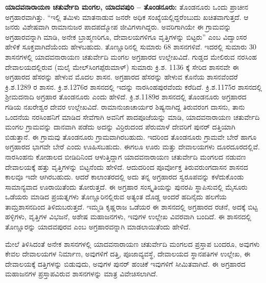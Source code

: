 \textbf{ಯಾದವನಾರಾಯಣ ಚತುರ್ವೇದಿ ಮಂಗಲ, ಯಾದವಪುರಿ – ತೊಂಡನೂರು:} ತೊಂಡನೂರು ಒಂದು ಪ್ರಾಚೀನ ಅಗ್ರಹಾರವಾಗಿತ್ತು. “ಇಲ್ಲಿ ತಮಿಳು ಮಾತನಾಡುವ ಜನರೇ ಅಧಿಕ ಸಂಖ್ಯೆಯಲ್ಲಿದ್ದರೆಂಬುದು ಖಚಿತವಾಗುತ್ತದೆ. ಆ ಜನರು ವಿಶೇಷವಾಗಿ ರಾಮಾನುಜರ ಪಾದಪದ್ಮೋಪ ಜೀವಿಗಳಾಗಿದ್ದರು. ಅವರಿಗಾಗಿಯೇ ಈ ಗ್ರಾಮವನ್ನು ಅಗ್ರಹಾರವನ್ನಾಗಿ ಮಾಡಿ, ಅನೇಕ ಬ್ರಾಹ್ಮಣರಿಗೂ, ದೇವಾಲಯಗಳಿಗೂ ವೃತ್ತಿಗಳನ್ನು ಬಿಟ್ಟರು” ಎಂಬ ವಿದ್ವಾಂಸರ ಹೇಳಿಕೆ ಸೂಕ್ತವಾಗಿದೆಯೆಂದು ಹೇಳಬಹುದು. ತೊಣ್ಣೂರಿನಲ್ಲಿ ಸುಮಾರು 68 ಶಾಸನಗಳಿವೆ. ಇದರಲ್ಲಿ ಸುಮಾರು 30 ಶಾಸನಗಳಲ್ಲಿ ಯಾದವನಾರಾಯಣ ಚತುರ್ವೇದಿ ಮಂಗಲ ಅಗ್ರಹಾರದ ಉಲ್ಲೇಖವಿದೆ. ಗುಡ್ಡದ ಮೇಲಿರುವ ನರಸಿಂಹ ದೇವಾಲಯದಲ್ಲಿರುವ (ಮಲೈ ಮೇಲ್​ ಸಿಂಗಪ್ಪೆರುಮಾಳ್​) ಸುಮಾರು ಕ್ರಿ.ಶ. 1136 ಕ್ಕೆ ಸೇರಿದ ಶಾಸನವೇ ಈ ಅಗ್ರಹಾರದ ಹೆಸರನ್ನು ಹೇಳುವ ಮೊದಲ ಶಾಸನ. ಅಗ್ರಹಾರದ ಹೆಸರನ್ನು ಹೇಳುವ ಕೊನೆಯ ಶಾಸನವೆಂದರೆ ಕ್ರಿ.ಶ.1289 ರ ಶಾಸನ. ಕ್ರಿ.ಶ.1276ರ ಶಾಸನದಲ್ಲಿ ಇದನ್ನು ನಾರಸಿಂಹಪುರವೆಂದು ಕರೆದಿದೆ. ಕ್ರಿ.ಶ.1175ರ ಶಾಸನದಲ್ಲಿ ಶ‍್ರೀಮದನಾದಿ ಅಗ್ರಹಾರ ತೊಂಡನೂರು ಎಂದು ಹೇಳಿದೆ. ಕ್ರಿ.ಶ.1189ರ ಶಾಸನದಲ್ಲಿ ತೊಂಡನೂರು ಅಗ್ರಹಾರದ ಗಡಿಯ ನಖರೇಶ್ವರ ದೇವರ ಉಲ್ಲೇಖವಿದೆ. ರಾಮಾನುಜಾಚಾರ್ಯರ ಶಿಷ್ಯನಾಗಿದ್ದ ತಿರುವರಂಗ ದಾಸನು, ತಾನು ಒಂದನೆಯ ನರಸಿಂಹನಿಗೆ ಮಾಡಿದ ಸೇವೆಗಾಗಿ ಅವನಿಗೆ ಪಾದಪೂಜೆಯನ್ನು ಮಾಡಿ, ಯಾದವನಾರಾಯಣ ಚತುರ್ವೇದಿ ಮಂಗಲ ಗ್ರಾಮವನ್ನು ದಾನವಾಗಿ ಪಡೆದು ಅದನ್ನು ವಿರ್ರಿರುದಂದ ಪೆರುಮಾಳೆ ದೇವರಿಗೆ ಪುನರ್​ ದತ್ತಿಯಾಗಿ ಬಿಡುತ್ತಾನೆ. ಈ ಗ್ರಾಮವು ತೊಂಡನೂರು ಗ್ರಾಮವಾಗಿರಬಹುದು. ಇದರಿಂದ ತೊಂಡನೂರು ಗ್ರಾಮವೇ ಬೇರೆ ಹಾಗೂ ಅಗ್ರಹಾರದ ಭಾಗವೇ ಬೇರೆ ಎಂದು ಊಹಿಸಬಹುದು. ಈಗಲೂ ಊರು ಮತ್ತು ದೇವಾಲಯಗಳು ದೂರದೂರದಲ್ಲಿವೆ. ನಾರಸಿಂಹನು ಕೋಡಾಲದ ಬೀಡಿದಿನಿಂದ ಆಳುತ್ತಿದ್ದಾಗ ಯಾದವನಾರಾಯಣ ಚತುರ್ವೇದಿ ಮಂಗಲದ ನಡುವಣ ದೇವಾಲಯಕ್ಕೆ ಹತ್ತು ವೃತ್ತಿಗಳನ್ನು ಬಿಟ್ಟನೆಂದು ಹೇಳಿದೆ. ಆದುದರಿಂದ ಪೂರ್ವೋಕ್ತ ತಿರುವರುಂಗದಾಸನ ಶಾಸನದ ಕಾಲವೂ ಇದೇ ಆಗಿರಬಹುದು. ಆದರೆ ಕಾಲಾಂತರದಲ್ಲಿ ಅದು ತನ್ನ ಅಗ್ರಹಾರದ ಸ್ವರೂಪವನ್ನು ಕಳೆದುಕೊಂಡು ಸಾಮಾನ್ಯವಾದ ಊರಾಯಿತೆಂದು ತೋರುತ್ತದೆ. ಈ ಅಗ್ರಹಾರ ಸಂಸ್ಕೃತಿಯನ್ನು ಪುನರಪಿ ಸ್ಥಾಪಿಸುವಲ್ಲಿ ಮೈಸೂರು ಒಡೆಯರು ಮಾಡಿದ ಪ್ರಯತ್ನಗಳು ತೊಣ್ಣೂರಿನಲ್ಲಿರುವ ಅತ್ಯಂತ ದೊಡ್ಡ ಅಂದರೆ ಹದಿನೈದು ಹಲಗೆಯ ತಾಮ್ರಶಾಸನದಿಂದ ತಿಳಿದುಬರುತ್ತದೆ. ಇಮ್ಮಡಿ ಕೃಷ್ಣರಾಜ ಒಡೆಯರ ಈ ಶಾಸನದಲ್ಲಿ ಅಗ್ರಹಾರದ ರಚನೆ, ಅದಕ್ಕೆ ಬಿಟ್ಟ ಹಳ್ಳಿಗಳು, ವೃತ್ತಿಗಳ ವಿಭಜನೆ, ಅಶೇಷ ಮಹಾಜನಗಳು, ಇವುಗಳ ಉಲ್ಲೇಖ ವಿವರವಾಗಿ ಬಂದಿದೆ. ಈ ಶಾಸನದಲ್ಲಿ ತೊಣ್ಣೂರನ್ನು ಯಾದವಪುರವ ಎಂಬ ಅಗ್ರಹಾರವನ್ನಾಗಿ ಮಾಡಲಾಯಿತೆಂದು ಹೇಳಿದೆ.

ಮೇಲೆ ತಿಳಿಸಿದಂತೆ ಅನೇಕ ಶಾಸನಗಳಲ್ಲಿ ಯಾದವನಾರಾಯಣ ಚತುರ್ವೇದಿ ಮಂಗಲದ ಪ್ರಸ್ತಾಪ ಬಂದರೂ, ಅವುಗಳು ಕೇವಲ ದೇವಾಲಯಗಳ ನಿರ್ಮಾಣ, ಅವುಗಳಿಗೆ ದತ್ತಿ, ಪೂಜಾವ್ಯವಸ್ಥೆ, ದೇವಾಲಯದ ಸ್ಥಾನಪತಿಗಳ ಉಲ್ಲೇಖ, ಈ ದೇವಾಲಯಕ್ಕೆ ದತ್ತಿಗಳನ್ನು ಬಿಡುವುದು, ಅವುಗಳ ಪುನರ್​ ಹಂಚಿಕೆ ಇವುಗಳಿಗೆ ಸೀಮಿತವಾಗಿದೆ. ಈ ಅಗ್ರಹಾರದ ಮಹಾಜನಗಳ ಪ್ರಸ್ತಾಪವಿರುವ ಶಾಸನಗಳನ್ನು ಮಾತ್ರ ವಿವೇಚಿಸಲಾಗಿದೆ.

